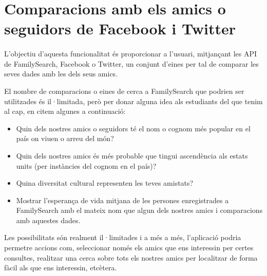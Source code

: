 \section{Comparacions amb els amics o seguidors de Facebook i Twitter}

    \paragraph{}
    L'objectiu d'aquesta funcionalitat és proporcionar a l'usuari, mitjançant les API de FamilySearch, Facebook o Twitter, un conjunt d'eines per tal de comparar les seves dades amb les dels seus amics.

    El nombre de comparacions o eines de cerca a FamilySearch que podrien ser utilitzades és il·limitada, però per donar alguna idea als estudiants del que tenim al cap, en citem algunes a continuació:

    \begin{itemize}
        \item Quin dels nostres amics o seguidors té el nom o cognom més popular en el país on viuen o arreu del món?
        \item Quin dels nostres amics és més probable que tingui ascendència als estats units (per instàncies del cognom en el país)?
        \item Quina diversitat cultural representen les teves amistats?
        \item Mostrar l'esperança de vida mitjana de les persones enregistrades a FamilySearch amb el mateix nom que algun dels nostres amics i comparacions amb aquestes dades.
    \end{itemize}

    Les possibilitats són realment il·limitades i a més a més, l'aplicació podria permetre accions com, seleccionar només els amics que ens interessin per certes consultes, realitzar una cerca sobre tots els nostres amics per localitzar de forma fàcil als que ens interessin, etcètera.
